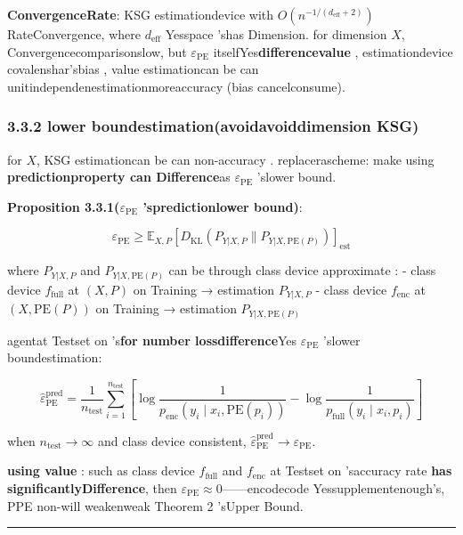 \documentclass[
  12pt,
]{article}
\begin{document}
\textbf{ConvergenceRate}: KSG estimationdevice with  \(O(n^{-1/(d_{\text{eff}}+2)})\)
RateConvergence, where \(d_{\text{eff}}\) Yesspace 'shas Dimension. for dimension
\(X\), Convergencecomparisonslow, but  \(\varepsilon_{\text{PE}}\)
itselfYes\textbf{differencevalue }, estimationdevice covalenshar'sbias , value estimationcan be can unitindependenestimationmoreaccuracy (bias cancelconsume). 

\subsubsection{3.3.2 lower boundestimation(avoidavoiddimension
KSG)}\label{ux4e0bux754cux4f30ux8ba1ux907fux514dux9ad8ux7ef4-ksg}

for  \(X\), KSG
estimationcan be can non-accuracy . replacerascheme: make using \textbf{predictionproperty can Difference}as 
\(\varepsilon_{\text{PE}}\) 'slower bound. 

\textbf{Proposition 3.3.1(\(\varepsilon_{\text{PE}}\) 'spredictionlower bound)}: 

\[\boxed{\varepsilon_{\text{PE}} \geq \mathbb{E}_{X,P}\left[D_{\text{KL}}(P_{Y|X,P} \| P_{Y|X,\text{PE}(P)})\right]_{\text{est}}}\]

where \(P_{Y|X,P}\) and  \(P_{Y|X,\text{PE}(P)}\) can be through class device approximate :  -
class device  \(f_{\text{full}}\) at  \((X, P)\) on Training → estimation \(P_{Y|X,P}\) -
class device  \(f_{\text{enc}}\) at  \((X, \text{PE}(P))\) on Training → estimation
\(P_{Y|X,\text{PE}(P)}\)

agentat Testset on 's\textbf{for number lossdifference}Yes \(\varepsilon_{\text{PE}}\)
'slower boundestimation: 

\[\hat{\varepsilon}_{\text{PE}}^{\text{pred}} = \frac{1}{n_{\text{test}}} \sum_{i=1}^{n_{\text{test}}} \left[\log \frac{1}{p_{\text{enc}}(y_i \mid x_i, \text{PE}(p_i))} - \log \frac{1}{p_{\text{full}}(y_i \mid x_i, p_i)}\right]\]

when  \(n_{\text{test}} \to \infty\)
and class device consistent, \(\hat{\varepsilon}_{\text{PE}}^{\text{pred}} \to \varepsilon_{\text{PE}}\). 

\textbf{using value }: such as class device  \(f_{\text{full}}\) and  \(f_{\text{enc}}\)
at Testset on 'saccuracy rate \textbf{has significantlyDifference}, then 
\(\varepsilon_{\text{PE}} \approx 0\)------encodecode Yessupplementenough's, PPE non-will weakenweak
Theorem 2 'sUpper Bound. 

\begin{center}\rule{0.5\linewidth}{0.5pt}\end{center}
\end{document}
